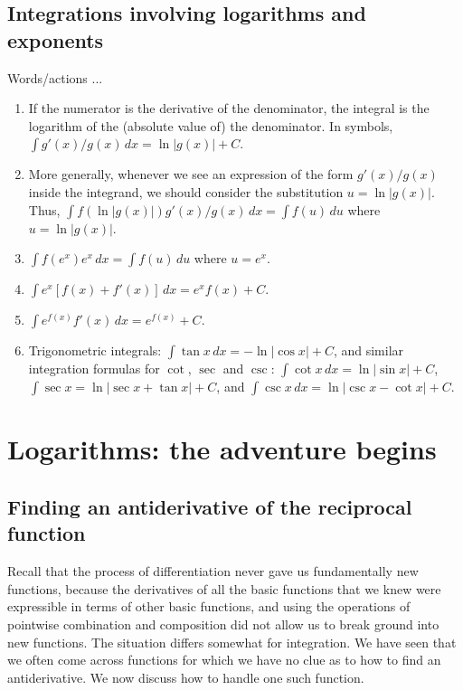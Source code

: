 \documentclass[10pt]{amsart}
\begin{document}
\subsection{Integrations involving logarithms and exponents}

Words/actions ...

\begin{enumerate}
\item If the numerator is the derivative of the denominator, the
  integral is the logarithm of the (absolute value of) the
  denominator. In symbols, $\int g'(x)/g(x) \, dx = \ln|g(x)| + C$.
\item More generally, whenever we see an expression of the form
  $g'(x)/g(x)$ inside the integrand, we should consider the
  substitution $u = \ln |g(x)|$. Thus, $\int f(\ln|g(x)|)g'(x)/g(x) \,
  dx = \int f(u) \, du$ where $u = \ln|g(x)|$.
\item $\int f(e^x) e^x \, dx = \int f(u) \, du$ where $u = e^x$.
\item $\int e^x[f(x) + f'(x)] \, dx = e^x f(x) + C$.
\item $\int e^{f(x)} f'(x) \, dx = e^{f(x)} + C$.
\item Trigonometric integrals: $\int \tan x \, dx = -\ln|\cos x| + C$,
  and similar integration formulas for $\cot$, $\sec$ and $\csc$:
  $\int \cot x \, dx = \ln|\sin x| + C$, $\int \sec x = \ln|\sec x +
  \tan x| + C$, and $\int \csc x \, dx = \ln |\csc x - \cot x| + C$.
\end{enumerate}


\section{Logarithms: the adventure begins}

\subsection{Finding an antiderivative of the reciprocal function}

Recall that the process of differentiation never gave us fundamentally
new functions, because the derivatives of all the basic functions that
we knew were expressible in terms of other basic functions, and using
the operations of pointwise combination and composition did not allow
us to break ground into new functions. The situation differs somewhat
for integration. We have seen that we often come across functions for
which we have no clue as to how to find an antiderivative. We now
discuss how to handle one such function.
\end{document}
